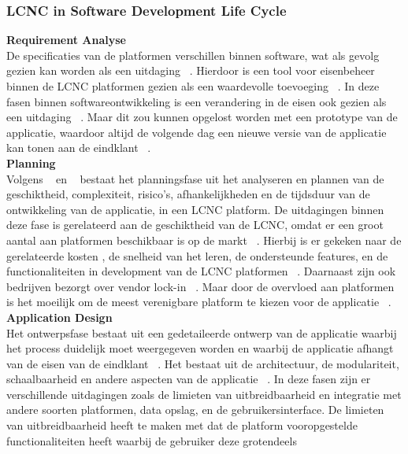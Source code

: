 \subsubsection*{LCNC in Software Development Life Cycle}
\label{subsec:lcnc-binnen-agile}
\textbf{Requirement Analyse}
\\
De specificaties van de platformen verschillen binnen software, wat als gevolg gezien kan worden als een uitdaging ~\autocite{Rokis_2022}. 
Hierdoor is een tool voor eisenbeheer binnen de LCNC platformen gezien als een waardevolle toevoeging ~\autocite{Rokis_2022}. 
In deze fasen binnen softwareontwikkeling is een verandering in de eisen ook gezien als een uitdaging ~\autocite{Rokis_2022}. 
Maar dit zou kunnen opgelost worden met een prototype van de applicatie, 
waardoor altijd de volgende dag een nieuwe versie van de applicatie kan tonen aan de eindklant ~\autocite{Rokis_2022}.
\\
\textbf{Planning}
\\
Volgens ~\textcite{Rokis_2022} en ~\textcite{Ghumatkar_2023}  bestaat het planningsfase uit het analyseren en plannen van de geschiktheid, complexiteit, risico's, afhankelijkheden en 
de tijdsduur van de ontwikkeling van de applicatie, in een LCNC platform. De uitdagingen binnen deze fase is gerelateerd aan de geschiktheid van de LCNC, 
omdat er een groot aantal aan platformen beschikbaar is op de markt ~\autocite{Rokis_2022}. Hierbij is er gekeken naar de gerelateerde kosten , de 
snelheid van het leren, de ondersteunde features, en de functionaliteiten in development van de LCNC platformen ~\autocite{Rokis_2022}. 
Daarnaast zijn ook bedrijven bezorgt over vendor lock-in ~\autocite{Rokis_2022}. Maar door de overvloed aan platformen is het moeilijk om 
de meest verenigbare platform te kiezen voor de applicatie ~\autocite{Rokis_2022}.
\\
\textbf{Application Design}
\\
Het ontwerpsfase bestaat uit een gedetaileerde ontwerp van de applicatie waarbij het process duidelijk moet weergegeven worden en waarbij de applicatie afhangt van de eisen van de eindklant ~\autocite{Ghumatkar_2023}. 
Het bestaat uit de architectuur, de modulariteit, schaalbaarheid en andere aspecten van de applicatie ~\autocite{Rokis_2022}. 
In deze fasen zijn er verschillende uitdagingen zoals de limieten van uitbreidbaarheid en integratie met andere soorten platformen, data opslag, en de gebruikersinterface. De limieten van uitbreidbaarheid heeft te maken met dat de platform vooropgestelde functionaliteiten heeft waarbij de gebruiker deze grotendeels 
